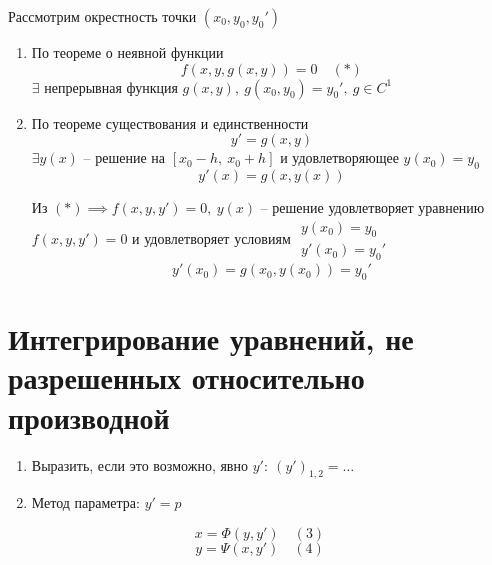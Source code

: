 \documentclass{report}
\theoremstyle{definition}
\begin{document}
Рассмотрим окрестность точки $(x_0,y_0,y_0')$
\begin{enumerate}
    \item По теореме о неявной функции
          \begin{equation*}
              f(x,y,g(x,y)) = 0 \quad (*)
          \end{equation*}
          $\exists$ непрерывная функция $g(x,y), \ g(x_0,y_0) = y_0', \ g \in C^1$
    \item По теореме существования и единственности
          \begin{equation*}
              y' = g(x,y)
          \end{equation*}
          $\exists y(x)$ -- решение на $[x_0-h, \ x_0+h]$ и удовлетворяющее $y(x_0) = y_0$
          \begin{equation*}
              y'(x) = g(x,y(x))
          \end{equation*}

          Из $(*) \implies f(x,y,y') = 0, \ y(x)$ -- решение удовлетворяет уравнению $f(x,y,y') = 0$ и удовлетворяет условиям $\begin{array}{l}
                  y(x_0) = y_0 \\
                  y'(x_0) = y_0'
              \end{array}$
          \begin{equation*}
              y'(x_0) = g(x_0,y(x_0)) = y_0'
          \end{equation*}
\end{enumerate}

\section*{Интегрирование уравнений, не разрешенных относительно производной}

\begin{enumerate}
    \item Выразить, если это возможно, явно $y': \ (y')_{1,2} = \ldots$
    \item Метод параметра: $y'=p$
\end{enumerate}
\begin{equation*}
    x = \Phi (y,y') \quad (3)
\end{equation*}
\begin{equation*}
    y = \Psi (x,y') \quad (4)
\end{equation*}
\end{document}
